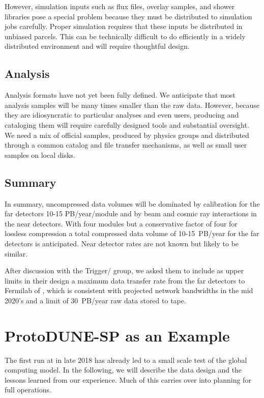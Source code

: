 However, simulation inputs such as flux files, overlay samples, and shower libraries pose a special problem because they must be distributed to simulation jobs carefully.  Proper simulation requires that these inputs be distributed in unbiased parcels.  This can be technically difficult to do efficiently in a widely distributed environment and will require thoughtful design. 

\subsection{Analysis}

Analysis formats have not yet been fully defined.  We anticipate that most analysis samples will be many times smaller than the raw data.  However, because they are idiosyncratic to particular analyses and even users,  producing and cataloging them will require carefully designed tools and substantial oversight. 
We need a mix of official samples, produced by physics groups and distributed through a common catalog and file transfer mechanisms, as well as small user samples on local disks. 

\subsection{Summary}
In summary, uncompressed data volumes will be dominated by calibration for the far detectors 10-15 PB/year/module and by beam and cosmic ray interactions in the near detectors.  With four  modules but a conservative factor of four for lossless compression a total compressed data volume of 10-15~PB/year for the far detectors is anticipated. Near detector rates are not known but likely to be similar.

After discussion with the  Trigger/ group, we asked them to include as upper limits in their design a  maximum data transfer rate from the far detectors to Fermilab of \surffnalbw, which is consistent with projected network bandwidths in the mid 2020's and a limit of 30~PB/year raw data stored to tape.  


\section{ProtoDUNE-SP as an Example}
\label{ch:exec-comp-proto-SP}
The first   run at  in late 2018 has already led to a small scale test of the global computing model.  In the following, we will describe the  data design and the lessons learned from our experience. Much of this carries over into planning for full  operations. 

